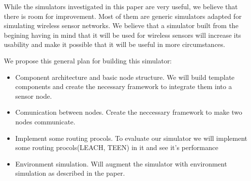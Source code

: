 
While the simulators investigated in this paper are very useful, we believe
that there is room for improvement. Most of them are generic simulators
adapted for simulating wireless sensor networks. We believe that a simulator
built from the begining having in mind that it will be used for wireless
sensors will increase its usability and make it possible that it will be
useful in more circumstances.

We propose this general plan for building this simulator:
\begin{itemize}
  \item Component architecture and basic node structure. We will build
  template components and create the necessary framework to integrate them
  into a sensor node.
  \item Comunication between nodes. Create the neccessary framework to make
  two nodes communicate.
  \item Implement some routing procols. To evaluate our simulator we will
  implement some routing procols(LEACH, TEEN) in it and see it's performance
  \item Environment simulation. Will augment the simulator with environment
  simulation as described in the paper.
\end{itemize}

